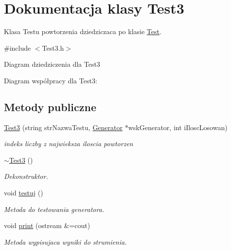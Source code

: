 \hypertarget{classTest3}{\section{Dokumentacja klasy Test3}
\label{classTest3}
}


Klasa Testu powtorzenia dziedziczaca po klasie \hyperlink{classTest}{Test}.  




{\ttfamily \#include $<$Test3.\+h$>$}



Diagram dziedziczenia dla Test3


Diagram współpracy dla Test3\+:
\subsection*{Metody publiczne}
\begin{DoxyCompactItemize}
\item 
\hyperlink{classTest3_a7b8dd9b229734e37bde6026ad2094c00}{Test3} (string str\+Nazwa\+Testu, \hyperlink{classGenerator}{Generator} $\ast$wsk\+Generator, int i\+Ilosc\+Losowan)
\begin{DoxyCompactList}\small\item\em indeks liczby z najwieksza iloscia powtorzen \end{DoxyCompactList}\item 
\hypertarget{classTest3_a439efa87d99cbce779c610b200178500}{\hyperlink{classTest3_a439efa87d99cbce779c610b200178500}{$\sim$\+Test3} ()}\label{classTest3_a439efa87d99cbce779c610b200178500}

\begin{DoxyCompactList}\small\item\em Dekonstruktor. \end{DoxyCompactList}\item 
void \hyperlink{classTest3_a37353515f46cf40f350871a17a3bc134}{testuj} ()
\begin{DoxyCompactList}\small\item\em Metoda do testowania generatora. \end{DoxyCompactList}\item 
void \hyperlink{classTest3_a58da51d98cae0cfe7a71c7d8ba0b635c}{print} (ostream \&=cout)
\begin{DoxyCompactList}\small\item\em Metoda wypisujaca wyniki do strumienia. \end{DoxyCompactList}\end{DoxyCompactItemize}
